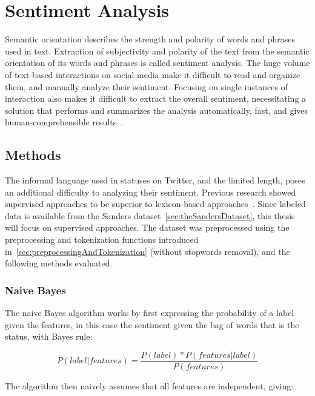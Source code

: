 \chapter{Sentiment Analysis}
\label{ch:sentimentAnalysis}

Semantic orientation describes the strength and polarity of words and phrases used in text.
Extraction of subjectivity and polarity of the text from the semantic orientation of its words and phrases is called sentiment analysis.
The huge volume of text-based interactions on social media make it difficult
to read and organize them, and manually analyze their sentiment.
Focusing on single instances of interaction also makes it difficult to extract the overall sentiment,
necessitating a solution that performs and summarizes the analysis automatically, fast, and gives human-comprehensible results~\cite{Sarlan2014}.

\section{Methods}
\label{sec:methods_sa}

The informal language used in statuses on Twitter, and the limited length, poses an additional difficulty
to analyzing their sentiment.
Previous research showed supervised approaches to be superior to lexicon-based approaches~\cite{Sarlan2014}.
Since labeled data is available from the Sanders dataset~\cref{sec:theSandersDataset},
this thesis will focus on supervised approaches.
The dataset was preprocessed using the preprocessing and tokenization functions introduced in~\cref{sec:preprocessingAndTokenization} (without stopwords removal),
and the following methods evaluated.

\subsection{Naive Bayes}
\label{subsec:naivebayes}

The naive Bayes algorithm works by first expressing the probability of a label given the features,
in this case the sentiment given the bag of words that is the status, with Bayes rule:

\begin{equation}
    P(label|features) = \frac{P(label)*P(features|label)}{P(features)}
\end{equation}

The algorithm then naively assumes that all features are independent, giving:

